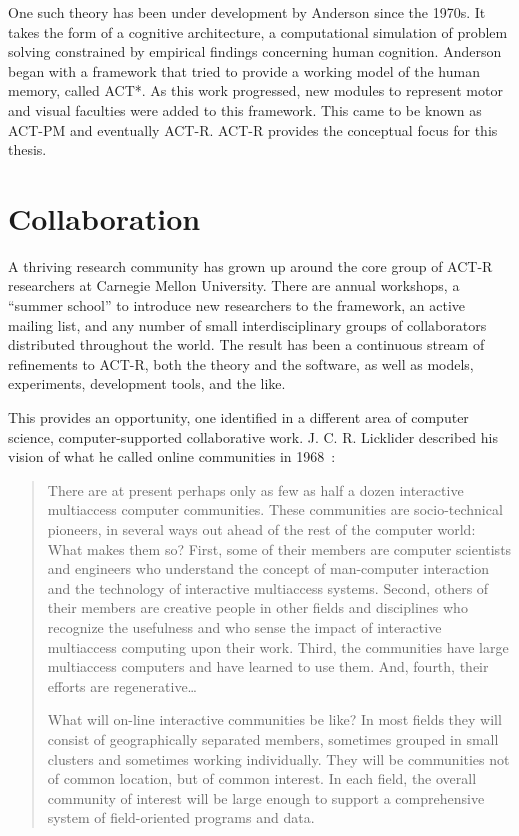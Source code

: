 One such theory has been under development by Anderson since the
1970s.  It takes the form of a cognitive architecture, a computational
simulation of problem solving constrained by empirical findings
concerning human cognition.  Anderson began with a framework that
tried to provide a working model of the human memory, called ACT*.  As
this work progressed, new modules to represent motor and visual
faculties were added to this framework. This came to be known as
ACT-PM and eventually ACT-R.  ACT-R provides the conceptual focus for
this thesis.

\section {Collaboration}
A thriving research community has grown up around the core group of
ACT-R researchers at Carnegie Mellon University.  There are annual
workshops, a ``summer school'' to introduce new researchers to the
framework, an active mailing list, and any number of small
interdisciplinary groups of collaborators distributed throughout the
world.  The result has been a continuous stream of refinements to
ACT-R, both the theory and the software, as well as models,
experiments, development tools, and the like.

This provides an opportunity, one identified in a different area of
computer science, computer-supported collaborative work.
J. C. R. Licklider described his vision of what he called online
communities in 1968~\cite{licklider1968computer}:

\begin{quotation}
  There are at present perhaps only as few as half a dozen
  interactive multiaccess computer communities. These communities are
  socio-technical pioneers, in several ways out ahead of the rest of
  the computer world: What makes them so? First, some of their members
  are computer scientists and engineers who understand the concept of
  man-computer interaction and the technology of interactive
  multiaccess systems. Second, others of their members are creative
  people in other fields and disciplines who recognize the usefulness
  and who sense the impact of interactive multiaccess computing upon
  their work. Third, the communities have large multiaccess computers
  and have learned to use them. And, fourth, their efforts are
  regenerative\ldots
 
 What will on-line interactive communities be like? In most
  fields they will consist of geographically separated members,
  sometimes grouped in small clusters and sometimes working
  individually. They will be communities not of common location, but
  of common interest. In each field, the overall community of interest
  will be large enough to support a comprehensive system of
  field-oriented programs and data.
\end{quotation}

